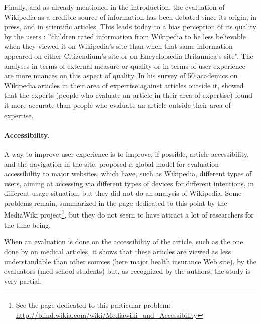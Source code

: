 Finally, and as already mentioned in the introduction, the evaluation
of Wikipedia as a credible source of information has been debated
since its origin, in press, and in scientific articles. This leads
today to a bias perception of its quality by the users \citep{FlanaginMetzger11}:
''children rated information from Wikipedia to be less believable
when they viewed it on Wikipedia's site than when that same information
appeared on either Citizendium's site or on Encyclopædia Britannica's
site''. The analyses in terms of external measure or quality or in
terms of user experience are more nuances on this aspect of quality.
In his survey of 50 academics on Wikipedia articles in their area
of expertise against articles outside it, \citet{Chesney06} showed
that the experts (people who evaluate an article in their area of
expertise) found it more accurate than people who evaluate an article
outside their area of expertise.

\paragraph{Accessibility.}

A way to improve user experience is to improve, if possible, article
accessibility, and the navigation in the site. \citet{LopesCarrico08}
proposed a global model for evaluation accessibility to major websites,
which have, such as Wikipedia, different types of users, aiming at
accessing via different types of devices for different intentions,
in different usage situation, but they did not do an analysis of Wikipedia.
Some problems remain, summarized in the page dedicated to this point
by the MediaWiki project\footnote{See the page dedicated to this particular problem: \url{http://blind.wikia.com/wiki/Mediawiki_and_Accessibility}},
but they do not seem to have attract a lot of researchers for the
time being.

When an evaluation is done on the accessibility of the article, such
as the one done by \citet{MuhlhauserOser08} on medical articles,
it shows that these articles are viewed as less understandable than
other sources (here major health insurance Web site), by the evaluators
(med school students) but, as recognized by the authors, the study
is very partial.